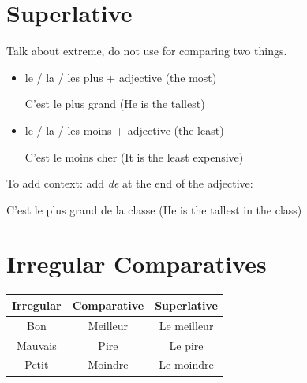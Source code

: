 \documentclass{book}
\begin{document}
    \section{Superlative}
        Talk about extreme, do not use for comparing two things.
        \begin{itemize}
            \item le / la / les plus + adjective (the most)
                \begin{center}
                    C'est le plus grand (He is the tallest)
                \end{center}
            \item le / la / les moins + adjective (the least)
                \begin{center}
                    C'est le moins cher (It is the least expensive)
                \end{center}
        \end{itemize}
        To add context: add \textit{de} at the end of the adjective:
        \begin{center}
            C'est le plus grand de la classe (He is the tallest in the class)
        \end{center}

    \section{Irregular Comparatives}
        \begin{center}
            \begin{tabular}{|c|c|c|}
                \hline
                \textbf{Irregular} & \textbf{Comparative} & \textbf{Superlative} \\
                \hline
                Bon & Meilleur & Le meilleur \\
                \hline
                Mauvais & Pire & Le pire \\
                \hline
                Petit & Moindre & Le moindre \\
                \hline
            \end{tabular}
        \end{center}
\end{document}
